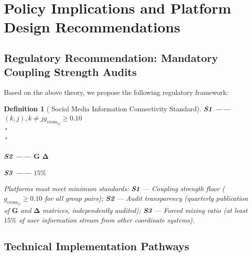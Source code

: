 \documentclass[11pt,a4paper]{article}
\newtheorem{definition}[theorem]{Definition}
\theoremstyle{remark}
\newcommand{\GCoupling}{g_{\text{cross}}}
\begin{document}
\section{}
\section{Policy Implications and Platform Design Recommendations}

\subsection{}

\subsection{Regulatory Recommendation: Mandatory Coupling Strength Audits}



Based on the above theory, we propose the following regulatory framework:

\begin{definition}[ Social Media Information Connectivity Standard]


\medskip
\noindent\textbf{S1 —— }
 $(k,j), k \neq j$$\GCoupling_{kj} \geq 0.10$
\\"\\"

\medskip
\noindent\textbf{S2 —— }
 $\mathbf{G}$  $\mathbf{\Delta}$ 


\medskip
\noindent\textbf{S3 —— }
 $15\%$ 

\bigskip
\noindent Platforms must meet minimum standards: \textbf{S1} --- Coupling strength floor
($\GCoupling_{kj} \geq 0.10$ for all group pairs); \textbf{S2} --- Audit transparency
(quarterly publication of $\mathbf{G}$ and $\mathbf{\Delta}$ matrices, independently
audited); \textbf{S3} --- Forced mixing ratio (at least $15\%$ of user information
stream from other coordinate systems).
\end{definition}

\subsection{}

\subsection{Technical Implementation Pathways}
\end{document}
